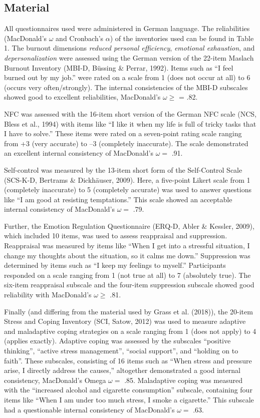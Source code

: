 \documentclass[
  english,
  man]{apa6}
\begin{document}
\subsection{Material}\label{material}

All questionnaires used were administered in German language.
The reliabilities (MacDonald's \(\omega\) and Cronbach's \(\alpha\)) of the inventories used can be found in Table 1.
The burnout dimensions \emph{reduced personal efficiency}, \emph{emotional exhaustion}, and \emph{depersonalization} were assessed using the German version of the 22-item Maslach Burnout Inventory (MBI-D, Büssing \& Perrar, 1992).
Items such as ``I feel burned out by my job.'' were rated on a scale from 1 (does not occur at all) to 6 (occurs very often/strongly).
The internal consistencies of the MBI-D subscales showed good to excellent reliabilities, MacDonald's \(\omega\ge\) = .82.

NFC was assessed with the 16-item short version of the German NFC scale (NCS, Bless et al., 1994) with items like ``I like it when my life is full of tricky tasks that I have to solve.'' These items were rated on a seven-point rating scale ranging from +3 (very accurate) to --3 (completely inaccurate).
The scale demonstrated an excellent internal consistency of MacDonald's \(\omega=\) .91.

Self-control was measured by the 13-item short form of the Self-Control Scale (SCS-K-D, Bertrams \& Dickhäuser, 2009).
Here, a five-point Likert scale from 1 (completely inaccurate) to 5 (completely accurate) was used to answer questions like ``I am good at resisting temptations.''
This scale showed an acceptable internal consistency of MacDonald's \(\omega=\) .79.

Further, the Emotion Regulation Questionnaire (ERQ-D, Abler \& Kessler, 2009), which included 10 items, was used to assess reappraisal and suppression. Reappraisal was measured by items like ``When I get into a stressful situation, I change my thoughts about the situation, so it calms me down.''
Suppression was determined by items such as ``I keep my feelings to myself.''
Participants responded on a scale ranging from 1 (not true at all) to 7 (absolutely true).
The six-item reappraisal subscale and the four-item suppression subscale showed good reliability with MacDonald's \(\omega\ge\) .81.

Finally (and differing from the material used by Grass et al. (2018)), the 20-item Stress and Coping Inventory (SCI, Satow, 2012) was used to measure adaptive and maladaptive coping strategies on a scale ranging from 1 (does not apply) to 4 (applies exactly).
Adaptive coping was assessed by the subscales ``positive thinking'', ``active stress management'', ``social support'', and ``holding on to faith''.
These subscales, consisting of 16 items such as ``When stress and pressure arise, I directly address the causes,'' altogether demonstrated a good internal consistency, MacDonald's Omega \(\omega=\) .85.
Maladaptive coping was measured with the ``increased alcohol and cigarette consumption'' subscale, containing four items like ``When I am under too much stress, I smoke a cigarette.''
This subscale had a questionable internal consistency of MacDonald's \(\omega=\) .63.
\end{document}
